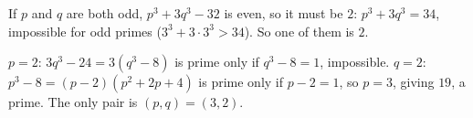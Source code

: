 If $p$ and $q$ are both odd, $p^3+3q^3-32$ is even, so it must be $2$: $p^3+3q^3=34$, impossible for odd primes ($3^3+3\cdot3^3>34$). So one of them is $2$.

$p=2$: $3q^3-24=3(q^3-8)$ is prime only if $q^3-8=1$, impossible. $q=2$: $p^3-8=(p-2)(p^2+2p+4)$ is prime only if $p-2=1$, so $p=3$, giving $19$, a prime. The only pair is $\boxed{(p,q)=(3,2)}$.
